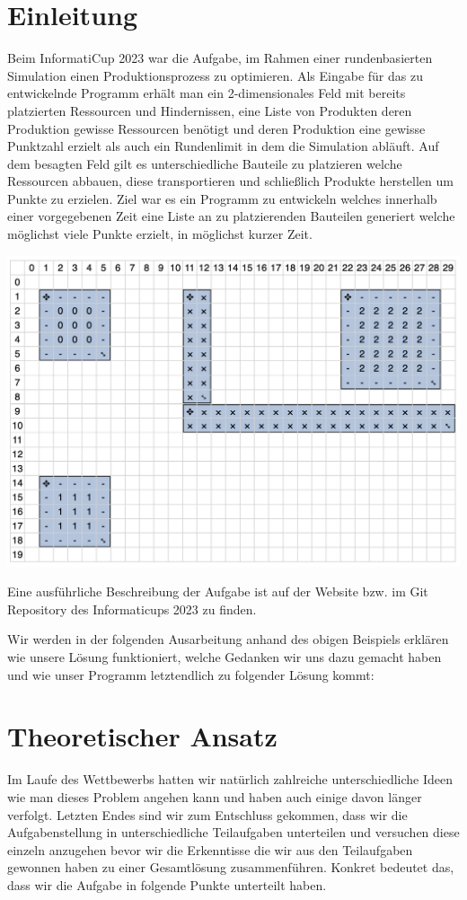 \documentclass[12pt,a4paper]{article}
\begin{document}
\section{Einleitung}
Beim InformatiCup 2023 war die Aufgabe, im Rahmen einer rundenbasierten Simulation einen Produktionsprozess zu optimieren. Als Eingabe für das zu entwickelnde Programm erhält man ein 2-dimensionales Feld mit bereits platzierten Ressourcen und Hindernissen, eine Liste von Produkten deren Produktion gewisse Ressourcen benötigt und deren Produktion eine gewisse Punktzahl erzielt als auch ein Rundenlimit in dem die Simulation abläuft. Auf dem besagten Feld gilt es unterschiedliche Bauteile zu platzieren welche Ressourcen abbauen, diese transportieren und schließlich Produkte herstellen um Punkte zu erzielen. Ziel war es ein Programm zu entwickeln welches innerhalb einer vorgegebenen Zeit eine Liste an zu platzierenden Bauteilen generiert welche möglichst viele Punkte erzielt, in möglichst kurzer Zeit.

\includegraphics[width=\textwidth]{task1.png}

Eine ausführliche Beschreibung der Aufgabe ist auf der Website bzw. im Git Repository des Informaticups 2023 zu finden.

Wir werden in der folgenden Ausarbeitung anhand des obigen Beispiels erklären wie unsere Lösung funktioniert, welche Gedanken wir uns dazu gemacht haben und wie unser Programm letztendlich zu folgender Lösung kommt:

\newpage

\section{Theoretischer Ansatz}
Im Laufe des Wettbewerbs hatten wir natürlich zahlreiche unterschiedliche Ideen wie man dieses Problem angehen kann und haben auch einige davon länger verfolgt. Letzten Endes sind wir zum Entschluss gekommen, dass wir die Aufgabenstellung in unterschiedliche Teilaufgaben unterteilen und versuchen diese einzeln anzugehen bevor wir die Erkenntisse die wir aus den Teilaufgaben gewonnen haben zu einer Gesamtlösung zusammenführen. Konkret bedeutet das, dass wir die Aufgabe in folgende Punkte unterteilt haben.
\end{document}
